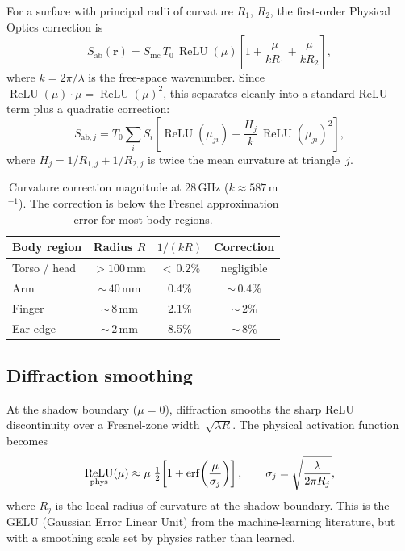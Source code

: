 \documentclass[11pt,a4paper]{article}
\theoremstyle{definition}      %
\newcommand{\rr}{\mathbf{r}}
\newcommand{\Sinc}{S_{\mathrm{inc}}}
\newcommand{\Sab}{S_{\mathrm{ab}}}
\DeclareMathOperator{\ReLU}{ReLU}
\begin{document}
For a surface with principal radii of curvature $R_1$, $R_2$, the
first-order Physical Optics correction is
\begin{equation}\label{eq:curvature}
  \Sab(\rr) = \Sinc\,T_0\,\ReLU(\mu)
  \left[1 + \frac{\mu}{kR_1}+\frac{\mu}{kR_2}\right],
\end{equation}
where $k=2\pi/\lambda$ is the free-space wavenumber.  Since
$\ReLU(\mu)\cdot\mu=\ReLU(\mu)^2$, this separates cleanly into a
standard ReLU term plus a quadratic correction:
\begin{equation}\label{eq:curvature-nn}
  \boxed{S_{\mathrm{ab},j} = T_0\sum_i S_i\!\left[
    \ReLU(\mu_{ji}) + \frac{H_j}{k}\,\ReLU(\mu_{ji})^2\right],}
\end{equation}
where $H_j=1/R_{1,j}+1/R_{2,j}$ is twice the mean curvature at
triangle~$j$.

\begin{table}[!htbp]
\centering
\caption{Curvature correction magnitude at 28\,GHz
  ($k\approx 587$\,m$^{-1}$).  The correction is below the Fresnel
  approximation error for most body regions.}\label{tab:curvature}
\begin{tabular}{lccc}
\toprule
Body region & Radius $R$ & $1/(kR)$ & Correction \\
\midrule
Torso / head  & $>100$\,mm & ${<}\,0.2\%$ & negligible \\
Arm           & ${\sim}\,40$\,mm & 0.4\% & ${\sim}\,0.4\%$ \\
Finger        & ${\sim}\,8$\,mm & 2.1\% & ${\sim}\,2\%$ \\
Ear edge      & ${\sim}\,2$\,mm & 8.5\% & ${\sim}\,8\%$ \\
\bottomrule
\end{tabular}
\end{table}

\subsection{Diffraction smoothing}\label{sec:diffraction}

At the shadow boundary ($\mu=0$), diffraction smooths the sharp ReLU
discontinuity over a Fresnel-zone width~$\sqrt{\lambda R}$.  The
physical activation function becomes
\begin{equation}\label{eq:gelu}
  \ReLU_{\mathrm{phys}}(\mu) \approx \mu\;\tfrac{1}{2}\!\left[
    1 + \erf\!\left(\frac{\mu}{\sigma_j}\right)\right],
  \qquad \sigma_j = \sqrt{\frac{\lambda}{2\pi R_j}},
\end{equation}
where $R_j$ is the local radius of curvature at the shadow boundary.
This is the GELU (Gaussian Error Linear Unit) from the machine-learning
literature, but with a smoothing scale set by physics rather than
learned.
\end{document}
